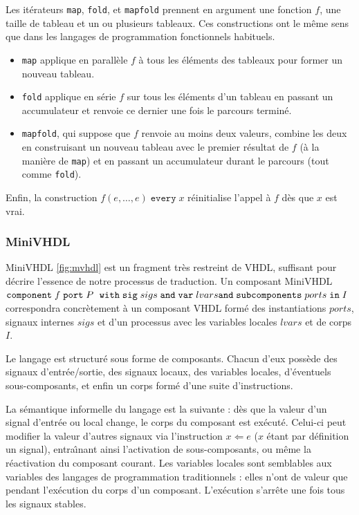 \documentclass[a4paper]{article}
\newcommand{\mybox}[1]{\mbox{\tt{#1}}}
\newcommand{\Component}[6]{\mybox{component} \; #1 \; \mybox{port} \; #2 \; \
  \mybox{with} \; \mybox{sig} \; #3 \; \mybox{and} \; \mybox{var} \; #4 \; \\
  \mybox{and} \; \mybox{subcomponents} \; #5 \; \mybox{in} \; #6}
\begin{document}
Les it\'erateurs \texttt{map}, \texttt{fold}, et \texttt{mapfold} prennent en
argument une fonction $f$, une taille de tableau et un ou plusieurs
tableaux. Ces constructions ont le m\^eme sens que dans les langages de
programmation fonctionnels habituels.

\begin{itemize}
\item \texttt{map} applique en parall\`ele $f$ \`a tous les \'el\'ements des tableaux
  pour former un nouveau tableau.
\item \texttt{fold} applique en s\'erie $f$ sur tous les \'el\'ements d'un tableau en
  passant un accumulateur et renvoie ce dernier une fois le parcours termin\'e.
\item \texttt{mapfold}, qui suppose que $f$ renvoie au moins deux valeurs,
  combine les deux en construisant un nouveau tableau avec le premier r\'esultat
  de $f$ (\`a la mani\`ere de \texttt{map}) et en passant un accumulateur durant le
  parcours (tout comme \texttt{fold}).
\end{itemize}

Enfin, la construction $f(e,\dots,e) \; \mathtt{every} \; x$ r\'einitialise
l'appel \`a $f$ d\`es que $x$ est vrai.

\subsubsection{MiniVHDL}

MiniVHDL \ref{fig:mvhdl} est un fragment tr\`es restreint de VHDL, suffisant pour
d\'ecrire l'essence de notre processus de traduction. Un composant MiniVHDL
$\Component{f}{P}{sigs}{lvars}{ports}{I}$ correspondra concr\`etement \`a un
composant VHDL form\'e des instantiations $ports$, signaux internes $sigs$ et d'un
processus avec les variables locales $lvars$ et de corps $I$.

Le langage est structur\'e sous forme de composants. Chacun d'eux poss\`ede des
signaux d'entr\'ee/sortie, des signaux locaux, des variables locales, d'\'eventuels
sous-composants, et enfin un corps form\'e d'une suite d'instructions.

La s\'emantique informelle du langage est la suivante : d\`es que la valeur d'un
signal d'entr\'ee ou local change, le corps du composant est ex\'ecut\'e. Celui-ci
peut modifier la valeur d'autres signaux via l'instruction $x \Leftarrow e$ ($x$
\'etant par d\'efinition un signal), entra\^{\i}nant ainsi l'activation de
sous-composants, ou m\^eme la r\'eactivation du composant courant. Les variables
locales sont semblables aux variables des langages de programmation
traditionnels : elles n'ont de valeur que pendant l'ex\'ecution du corps d'un
composant. L'ex\'ecution s'arr\^ete une fois tous les signaux stables.
\end{document}

